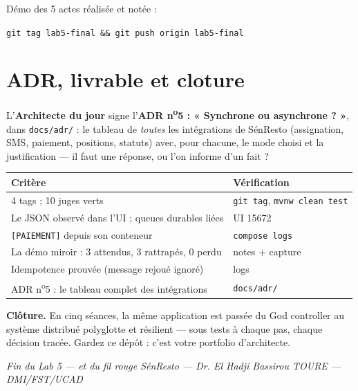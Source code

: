 \documentclass[a4paper,11pt]{article}
\begin{document}
\begin{tagbox}
Démo des 5 actes réalisée et notée :
\begin{center}\texttt{git tag lab5-final \&\& git push origin lab5-final}\end{center}
\end{tagbox}

\section{ADR, livrable et cloture}

L'\textbf{Architecte du jour} signe l'\textbf{ADR n\textsuperscript{o}5 : « Synchrone ou
asynchrone ? »}, dans \texttt{docs/adr/} : le tableau de
\emph{toutes} les intégrations de SénResto (assignation, SMS, paiement,
positions, statuts) avec, pour chacune, le mode choisi et la justification
--- il faut une réponse, ou l'on informe d'un fait ?

\begin{center}
\small
\begin{tabular}{p{}p{}}
\toprule
\textbf{Critère} & \textbf{Vérification} \\
\midrule
4 tags ; 10 juges verts & \texttt{git tag}, \texttt{mvnw clean test} \\
Le JSON observé dans l'UI ; queues durables liées & UI 15672 \\
\texttt{[PAIEMENT]} depuis son conteneur & \texttt{compose logs} \\
La démo miroir : 3 attendus, 3 rattrapés, 0 perdu & notes + capture \\
Idempotence prouvée (message rejoué ignoré) & logs \\
ADR n\textsuperscript{o}5 : le tableau complet des intégrations & \texttt{docs/adr/} \\
\bottomrule
\end{tabular}
\end{center}

\vspace{0.5em}
\noindent\textbf{Clôture.} En cinq séances, la même application est passée
du God controller au système distribué polyglotte et résilient --- sous
tests à chaque pas, chaque décision tracée. Gardez ce dépôt : c'est votre
portfolio d'architecte.

\vspace{1em}
\begin{center}
\textit{Fin du Lab 5 --- et du fil rouge SénResto --- Dr. El Hadji Bassirou TOURE --- DMI/FST/UCAD}
\end{center}
\end{document}

